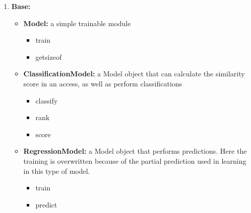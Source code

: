 \documentclass[12pt]{article}
\begin{document}
\begin{enumerate}
    \item \textbf{Base:}
    
    \begin{itemize}
    \item \textbf{Model:} a simple trainable module
    \begin{itemize}
        \item train
        \item getsizeof
    \end{itemize}
    \item \textbf{ClassificationModel:} a Model object that can calculate the similarity score in an access, as well as perform classifications
    \begin{itemize}
        \item classify
        \item rank
        \item score
    \end{itemize}
    \item \textbf{RegressionModel:} a Model object that performs predictions. Here the training is overwritten because of the partial prediction used in learning in this type of model.
    \begin{itemize}
        \item train
        \item predict
    \end{itemize}
\end{itemize}


\end{enumerate}
\end{document}
